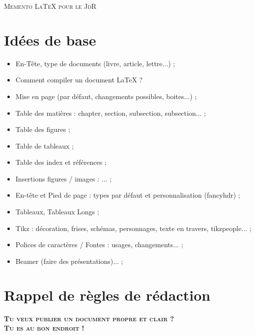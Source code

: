\documentclass[11pt,twoside,a4paper]{article}
\begin{document}
\begin{landscape}


\begin{multicols}{2}

	\textsc{\Huge Memento LaTeX pour le JdR}~\\
	
	\tableofcontents
	
	\vfill
	\columnbreak
	
	\section{Idées de base}
	\begin{itemize}
		\item En-Tête, type de documents (livre, article, lettre...) ; 
		\item Comment compiler un document LaTeX ?
		\item Mise en page (par défaut, changements possibles, boites...) ;
		\item Table des matières : chapter, section, subsection, subsection... ; 
		\item Table des figures ; 
		\item Table de tableaux ; 
		\item Table des index et références ; 
		\item Insertions figures / images : ... ; 
		\item En-tête et Pied de page : types par défaut et personnalisation (fancyhdr) ; 
		\item Tableaux, Tableaux Longs ; 
		\item Tikz : décoration, frises, schémas, personnages, texte en travers, tikzpeople... ; 
		\item Polices de caractères / Fontes : usages, changements... ; 
		\item Beamer (faire des présentations)... ; 
	\end{itemize}
	
	\section{Rappel de règles de rédaction}
	
	\textbf{\textsc{Tu veux publier un document propre et clair ?~\\ Tu es au bon endroit !}}~\\
	

\end{multicols}
\end{landscape}
\end{document}
